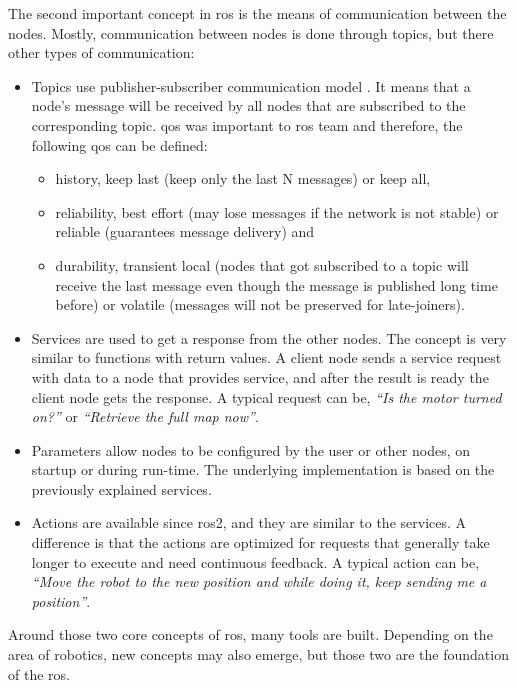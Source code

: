 The second important concept in \ac{ros} is the means of communication between the nodes.
Mostly, communication between nodes is done through topics, but there other types of communication:
\begin{itemize}
    \item Topics use publisher-subscriber communication model \cite{chen_beaconvey_2018}.
    It means that a node's message will be received by all nodes that are subscribed to the corresponding topic. 
    \ac{qos} was important to \ac{ros} team and therefore, the following \ac{qos} can be defined:
    \begin{itemize}
        \item history, keep last (keep only the last N messages) or keep all,
        \item reliability, best effort (may lose messages if the network is not stable) or reliable (guarantees message delivery) and
        \item durability, transient local (nodes that got subscribed to a topic will receive the last message even though the message is published long time before) or volatile (messages will not be preserved for late-joiners).
    \end{itemize}
    \item Services are used to get a response from the other nodes.
    The concept is very similar to functions with return values.
    A client node sends a service request with data to a node that provides service, and after the result is ready the client node gets the response.
    A typical request can be, \textit{``Is the motor turned on?''} or \textit{``Retrieve the full map now''}.
    \item Parameters allow nodes to be configured by the user or other nodes, on startup or during run-time.
    The underlying implementation is based on the previously explained services.
    \item Actions are available since \ac{ros2}, and they are similar to the services.
    A difference is that the actions are optimized for requests that generally take longer to execute and need continuous feedback. A typical action can be, \textit{``Move the robot to the new position and while doing it, keep sending me a position''}.
\end{itemize}

Around those two core concepts of \ac{ros}, many tools are built.
Depending on the area of robotics, new concepts may also emerge, but those two are the foundation of the \ac{ros}.

